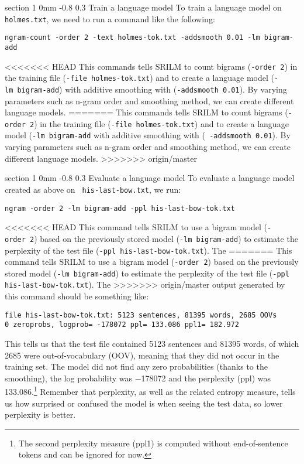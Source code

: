 \documentclass[11pt]{article}
\makeatletter
\newcommand{\newsec}[2]{\section{#1}\label{sec:#2}\noindent}
\renewcommand{\section}{\@startsection
{section}%
{1}%
{0mm}%
{-0.8\baselineskip}%
{0.3\baselineskip}%
{\bfseries\large}}%
\makeatother
\begin{document}
\newsec{Train a language model}{train}%
To train a language model on {\tt holmes.txt}, we need to run a
command like the following:
\begin{verbatim}
ngram-count -order 2 -text holmes-tok.txt -addsmooth 0.01 -lm bigram-add
\end{verbatim}
<<<<<<< HEAD
This commands tells SRILM to count bigrams ({\tt -order~2}) in the training file ({\tt -file~holmes-tok.txt})
and to create a language model ({\tt -lm~bigram-add}) with additive smoothing with ({\tt -addsmooth~0.01}).
By varying parameters such as n-gram order and smoothing method, we can create different language models.
=======
This commands tells SRILM to count bigrams ({\tt -order\,2}) in the
training file ({\tt -file\,holmes-tok.txt}) and to create a language
model ({\tt -lm\,bigram-add} with additive smoothing with ({\tt
  -addsmooth\,0.01}).  By varying parameters such as n-gram order and
smoothing method, we can create different language models.
>>>>>>> origin/master

\newsec{Evaluate a language model}{eval}%
To evaluate a language model created as above on {\tt
  his-last-bow.txt}, we run:
\begin{verbatim}
ngram -order 2 -lm bigram-add -ppl his-last-bow-tok.txt
\end{verbatim}
<<<<<<< HEAD
This command tells SRILM to use a bigram model ({\tt -order~2}) based
on the previously stored model ({\tt -lm~bigram-add}) to estimate the
perplexity of the test file ({\tt -ppl~his-last-bow-tok.txt}). The
=======
This command tells SRILM to use a bigram model ({\tt -order\,2}) based
on the previously stored model ({\tt -lm\,bigram-add}) to estimate the
perplexity of the test file ({\tt -ppl\,his-last-bow-tok.txt}). The
>>>>>>> origin/master
output generated by this command should be something like:
\begin{verbatim}
file his-last-bow-tok.txt: 5123 sentences, 81395 words, 2685 OOVs
0 zeroprobs, logprob= -178072 ppl= 133.086 ppl1= 182.972
\end{verbatim}
This tells us that the test file contained 5123 sentences and 81395
words, of which 2685 were out-of-vocabulary (OOV), meaning that they
did not occur in the training set. The model did not find any zero
probabilities (thanks to the smoothing), the log probability was
$-$178072 and the perplexity (ppl) was 133.086.\footnote{The second
  perplexity measure (ppl1) is computed without end-of-sentence tokens
  and can be ignored for now.} Remember that perplexity, as well as
the related entropy measure, tells us how surprised or confused the
model is when seeing the test data, so lower perplexity is better.
\end{document}
